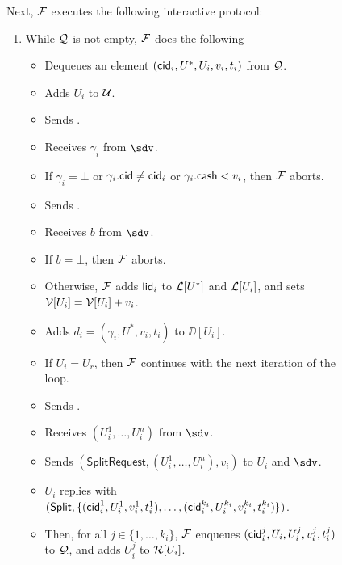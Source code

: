 \begin{figure*}[!t]
{{Next, $\mathcal{F}$ executes the following interactive protocol:

\begin{enumerate}
	
	\item While $\mathcal{Q}$ is not empty, $\mathcal{F}$ does the following
	\begin{itemize}[label=-]
		\item Dequeues an element $(\mathsf{cid}_i,U^*,U_i,v_i,t_i)$ from $\mathcal{Q}$.
		\item Adds $U_i$ to $\mathcal{U}$.
		\item Sends .
		\item Receives $\gamma_i$ from $\sdv$.
		\item If $\gamma_i = \bot$ or $\gamma_i.\mathsf{cid} \neq \mathsf{cid}_i$ or $\gamma_i.\mathsf{cash} < v_i$, 
		then $\mathcal{F}$ aborts.
		\item Sends .
		\item Receives $b$ from $\sdv$.
		\item If $b = \bot$, then $\mathcal{F}$ aborts.
		\item Otherwise, $\mathcal{F}$ adds $\mathsf{lid}_i$ to $\mathcal{L}[U^*]$ and $\mathcal{L}[U_i]$, and sets $\mathcal{V}[U_i] = 
		\mathcal{V}[U_i] + v_i$.
		\item Adds $d_i = (\gamma_i,U^*,v_i,t_i)$ to $\DD[U_i]$.
		\item If $U_i = U_r$, then $\mathcal{F}$ continues with the next iteration of the loop.
		\item Sends .
		\item Receives $(U_i^1,\ldots,U_i^n)$ from $\sdv$.
		\item Sends $(\mathsf{SplitRequest}, (U_i^1,\ldots,U_i^n), v_i)$ to $U_i$ 
		and $\sdv$.
		\item $U_i$ replies with $(\mathsf{Split}, \{(\mathsf{cid}_i^1,U_i^1,v_i^1,t_i^1),\ldots,
		(\mathsf{cid}_i^{k_i},U_i^{k_i},v_i^{k_i},t_i^{k_i})\})$.
		\item Then, for all $j \in \{1,\ldots,k_i\}$, $\mathcal{F}$ enqueues 
		$(\mathsf{cid}_i^j,U_i,U_i^j,v_i^j,t_i^j)$ to $\mathcal{Q}$, and adds $U_i^j$ to $\mathcal{R}[U_i]$.
	\end{itemize}
	

\end{enumerate}}}
\end{figure*}
